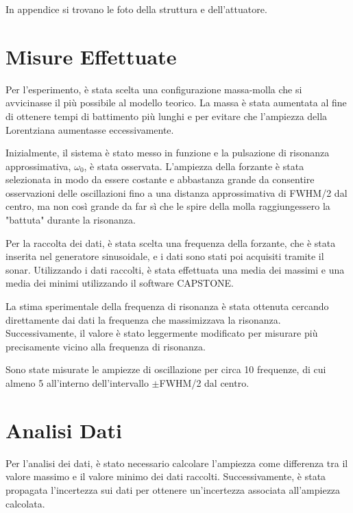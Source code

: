 \documentclass[12pt]{article}
\begin{document}
In appendice si trovano le foto della struttura e dell'attuatore.


\section{Misure Effettuate}

Per l'esperimento, è stata scelta una configurazione massa-molla che si avvicinasse il più possibile al modello teorico. La massa è stata aumentata al fine di ottenere tempi di battimento più lunghi e per evitare che l'ampiezza della Lorentziana aumentasse eccessivamente.

Inizialmente, il sistema è stato messo in funzione e la pulsazione di risonanza approssimativa, $\omega_0$, è stata osservata. L'ampiezza della forzante è stata selezionata in modo da essere costante e abbastanza grande da consentire osservazioni delle oscillazioni fino a una distanza approssimativa di FWHM/2 dal centro, ma non così grande da far sì che le spire della molla raggiungessero la "battuta" durante la risonanza.

Per la raccolta dei dati, è stata scelta una frequenza della forzante, che è stata inserita nel generatore sinusoidale, e i dati sono stati poi acquisiti tramite il sonar. Utilizzando i dati raccolti, è stata effettuata una media dei massimi e una media dei minimi utilizzando il software CAPSTONE.

La stima sperimentale della frequenza di risonanza è stata ottenuta cercando direttamente dai dati la frequenza che massimizzava la risonanza. Successivamente, il valore è stato leggermente modificato per misurare più precisamente vicino alla frequenza di risonanza.

Sono state misurate le ampiezze di oscillazione per circa 10 frequenze, di cui almeno 5 all'interno dell'intervallo $\pm$FWHM/2 dal centro.


\section{Analisi Dati}

Per l'analisi dei dati, è stato necessario calcolare l'ampiezza come differenza tra il valore massimo e il valore minimo dei dati raccolti. Successivamente, è stata propagata l'incertezza sui dati per ottenere un'incertezza associata all'ampiezza calcolata.
\end{document}
